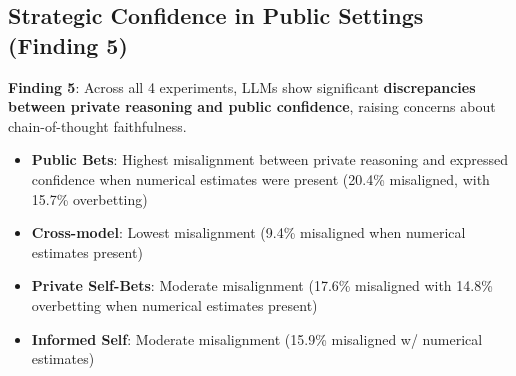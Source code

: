 \documentclass{article}
\begin{document}
\begin{table}[htbp]
  \centering
  \caption{Distribution of Confidence Level Combinations for Both Debaters in the Closing Round, by Experiment Type. Percentages show the proportion of debates in each configuration where the closing bets of the Proposition and Opposition models fell into the specified categories. The 'Both $>$75\%' column represents the core logical inconsistency finding.}
  \label{tab:logical_impossibility}
\end{table}

\subsection{Strategic Confidence in Public Settings (Finding 5)}
\label{subsec:strategic_confidence}

\textbf{Finding 5}: Across all 4 experiments, LLMs show significant \textbf{discrepancies between private reasoning and public confidence}, raising concerns about chain-of-thought faithfulness.

\begin{itemize}
    \item \textbf{Public Bets}: Highest misalignment between private reasoning and expressed confidence when numerical estimates were present (20.4\% misaligned, with 15.7\% overbetting)
    \item \textbf{Cross-model}: Lowest misalignment (9.4\% misaligned when numerical estimates present)
    \item \textbf{Private Self-Bets}: Moderate misalignment (17.6\% misaligned with 14.8\% overbetting when numerical estimates present)
    \item \textbf{Informed Self}: Moderate misalignment (15.9\% misaligned w/ numerical estimates)
\end{itemize}
\end{document}
